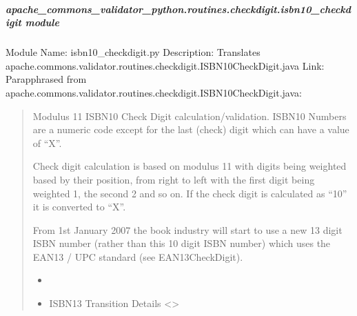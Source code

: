 \documentclass[letterpaper,10pt,english]{sphinxmanual}
\begin{document}
\subparagraph{apache\_commons\_validator\_python.routines.checkdigit.isbn10\_checkdigit module}
\label{\detokenize{apache_commons_validator_python.routines.checkdigit:module-apache_commons_validator_python.routines.checkdigit.isbn10_checkdigit}}\label{\detokenize{apache_commons_validator_python.routines.checkdigit:apache-commons-validator-python-routines-checkdigit-isbn10-checkdigit-module}}
\sphinxAtStartPar
Module Name: isbn10\_checkdigit.py
Description: Translates apache.commons.validator.routines.checkdigit.ISBN10CheckDigit.java
Link: 
Parapphrased from apache.commons.validator.routines.checkdigit.ISBN10CheckDigit.java:
\begin{quote}

\sphinxAtStartPar
Modulus 11 ISBN\sphinxhyphen{}10 Check Digit calculation/validation.
ISBN\sphinxhyphen{}10 Numbers are a numeric code except for the last (check) digit which can have a value of “X”.

\sphinxAtStartPar
Check digit calculation is based on modulus 11 with digits being weighted based by their position,
from right to left  with the first digit being weighted 1, the second 2 and so on.
If the check digit is calculated as “10” it is converted to “X”.

\sphinxAtStartPar
{}
From 1st January 2007 the book industry will start to use a new 13 digit ISBN number
(rather than this 10 digit ISBN number) which uses the EAN\sphinxhyphen{}13 / UPC standard (see EAN13CheckDigit).
\begin{description}
\begin{itemize}
\item {} 
\sphinxAtStartPar
{}

\item {} 
\sphinxAtStartPar
{\color{red}\bfseries{}\textasciigrave{}}ISBN\sphinxhyphen{}13 Transition Details \textless{}\textgreater{}

\end{itemize}

\end{description}
\end{quote}
\end{document}
